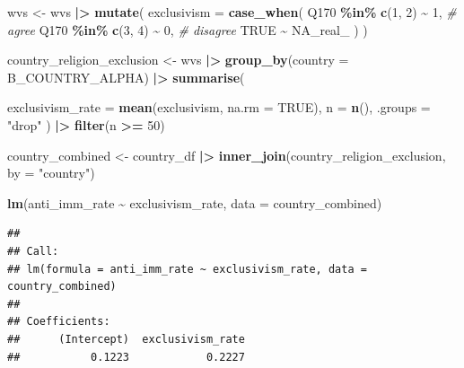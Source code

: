 \documentclass[
]{article}
\newenvironment{Shaded}{\begin{snugshade}}{\end{snugshade}}
\newcommand{\AttributeTok}[1]{\textcolor[rgb]{0.13,0.29,0.53}{#1}}
\newcommand{\CommentTok}[1]{\textcolor[rgb]{0.56,0.35,0.01}{\textit{#1}}}
\newcommand{\ConstantTok}[1]{\textcolor[rgb]{0.56,0.35,0.01}{#1}}
\newcommand{\DecValTok}[1]{\textcolor[rgb]{0.00,0.00,0.81}{#1}}
\newcommand{\FunctionTok}[1]{\textcolor[rgb]{0.13,0.29,0.53}{\textbf{#1}}}
\newcommand{\NormalTok}[1]{#1}
\newcommand{\OtherTok}[1]{\textcolor[rgb]{0.56,0.35,0.01}{#1}}
\newcommand{\SpecialCharTok}[1]{\textcolor[rgb]{0.81,0.36,0.00}{\textbf{#1}}}
\newcommand{\StringTok}[1]{\textcolor[rgb]{0.31,0.60,0.02}{#1}}
\begin{document}
\begin{Shaded}
\begin{Highlighting}[]
\NormalTok{wvs }\OtherTok{\textless{}{-}}\NormalTok{ wvs }\SpecialCharTok{|\textgreater{}}
  \FunctionTok{mutate}\NormalTok{(}
    \AttributeTok{exclusivism =} \FunctionTok{case\_when}\NormalTok{(}
\NormalTok{      Q170 }\SpecialCharTok{\%in\%} \FunctionTok{c}\NormalTok{(}\DecValTok{1}\NormalTok{, }\DecValTok{2}\NormalTok{) }\SpecialCharTok{\textasciitilde{}} \DecValTok{1}\NormalTok{,   }\CommentTok{\# agree}
\NormalTok{      Q170 }\SpecialCharTok{\%in\%} \FunctionTok{c}\NormalTok{(}\DecValTok{3}\NormalTok{, }\DecValTok{4}\NormalTok{) }\SpecialCharTok{\textasciitilde{}} \DecValTok{0}\NormalTok{,   }\CommentTok{\# disagree}
      \ConstantTok{TRUE} \SpecialCharTok{\textasciitilde{}} \ConstantTok{NA\_real\_}
\NormalTok{    )}
\NormalTok{  )}

\NormalTok{country\_religion\_exclusion }\OtherTok{\textless{}{-}}\NormalTok{ wvs }\SpecialCharTok{|\textgreater{}}
  \FunctionTok{group\_by}\NormalTok{(}\AttributeTok{country =}\NormalTok{ B\_COUNTRY\_ALPHA) }\SpecialCharTok{|\textgreater{}}
  \FunctionTok{summarise}\NormalTok{(}
   
    \AttributeTok{exclusivism\_rate =} \FunctionTok{mean}\NormalTok{(exclusivism, }\AttributeTok{na.rm =} \ConstantTok{TRUE}\NormalTok{),}
    \AttributeTok{n =} \FunctionTok{n}\NormalTok{(),}
    \AttributeTok{.groups =} \StringTok{"drop"}
\NormalTok{  ) }\SpecialCharTok{|\textgreater{}}
  \FunctionTok{filter}\NormalTok{(n }\SpecialCharTok{\textgreater{}=} \DecValTok{50}\NormalTok{)}

\NormalTok{country\_combined }\OtherTok{\textless{}{-}}\NormalTok{ country\_df }\SpecialCharTok{|\textgreater{}}
  \FunctionTok{inner\_join}\NormalTok{(country\_religion\_exclusion, }\AttributeTok{by =} \StringTok{"country"}\NormalTok{)}

\FunctionTok{lm}\NormalTok{(anti\_imm\_rate }\SpecialCharTok{\textasciitilde{}}\NormalTok{ exclusivism\_rate, }\AttributeTok{data =}\NormalTok{ country\_combined)}
\end{Highlighting}
\end{Shaded}

\begin{verbatim}
## 
## Call:
## lm(formula = anti_imm_rate ~ exclusivism_rate, data = country_combined)
## 
## Coefficients:
##      (Intercept)  exclusivism_rate  
##           0.1223            0.2227
\end{verbatim}
\end{document}
